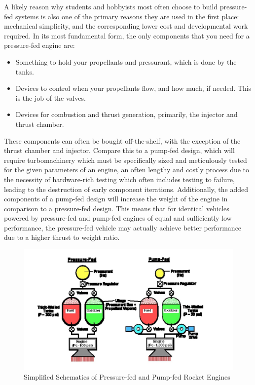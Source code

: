 \documentclass[12pt, letterpaper]{article}
\begin{document}
A likely reason why students and hobbyists most often choose to build pressure-fed systems is also one of the primary reasons they are used in the first place: mechanical simplicity, and the corresponding lower cost and developmental work required. In its most fundamental form, the only components that you need for a pressure-fed engine are:
\begin{itemize}
    \item Something to hold your propellants and pressurant, which is done by the tanks.
    \item Devices to control when your propellants flow, and how much, if needed. This is the job of the valves.
    \item Devices for combustion and thrust generation, primarily, the injector and thrust chamber.
\end{itemize}

These components can often be bought off-the-shelf, with the exception of the thrust chamber and injector. Compare this to a pump-fed design, which will require turbomachinery which must be specifically sized and meticulously tested for the given parameters of an engine, an often lengthy and costly process due to the necessity of hardware-rich testing which often includes testing to failure, leading to the destruction of early component iterations. Additionally, the added components of a pump-fed design will increase the weight of the engine in comparison to a pressure-fed design. This means that for identical vehicles powered by pressure-fed and pump-fed engines of equal and sufficiently low performance, the pressure-fed vehicle may actually achieve better performance due to a higher thrust to weight ratio.

\begin{figure}[t]
    \centering
    \includegraphics[width=15cm]{Diagrams/PumpVPressure.jpg}
    \caption{Simplified Schematics of Pressure-fed and Pump-fed Rocket Engines}
\end{figure}
\end{document}
